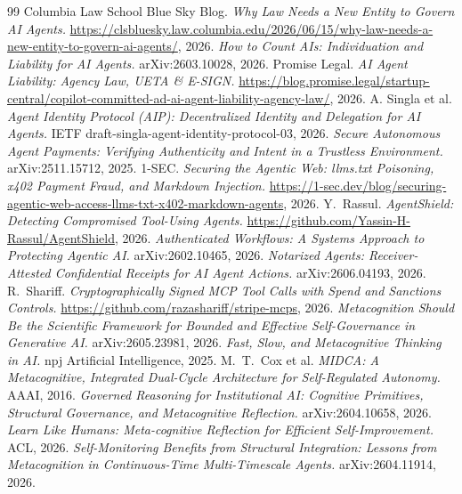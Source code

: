 \documentclass[11pt]{article}
\begin{document}
\begin{thebibliography}{99}
 Columbia Law School Blue Sky Blog. \emph{Why Law Needs a New Entity to Govern AI Agents.} \url{https://clsbluesky.law.columbia.edu/2026/06/15/why-law-needs-a-new-entity-to-govern-ai-agents/}, 2026.
 \emph{How to Count AIs: Individuation and Liability for AI Agents.} arXiv:2603.10028, 2026.
 Promise Legal. \emph{AI Agent Liability: Agency Law, UETA \& E-SIGN.} \url{https://blog.promise.legal/startup-central/copilot-committed-ad-ai-agent-liability-agency-law/}, 2026.
 A. Singla et al. \emph{Agent Identity Protocol (AIP): Decentralized Identity and Delegation for AI Agents.} IETF draft-singla-agent-identity-protocol-03, 2026.
 \emph{Secure Autonomous Agent Payments: Verifying Authenticity and Intent in a Trustless Environment.} arXiv:2511.15712, 2025.
 1-SEC. \emph{Securing the Agentic Web: llms.txt Poisoning, x402 Payment Fraud, and Markdown Injection.} \url{https://1-sec.dev/blog/securing-agentic-web-access-llms-txt-x402-markdown-agents}, 2026.
 Y.\ Rassul. \emph{AgentShield: Detecting Compromised Tool-Using Agents.} \url{https://github.com/Yassin-H-Rassul/AgentShield}, 2026.
 \emph{Authenticated Workflows: A Systems Approach to Protecting Agentic AI.} arXiv:2602.10465, 2026.
 \emph{Notarized Agents: Receiver-Attested Confidential Receipts for AI Agent Actions.} arXiv:2606.04193, 2026.
 R.\ Shariff. \emph{Cryptographically Signed MCP Tool Calls with Spend and Sanctions Controls.} \url{https://github.com/razashariff/stripe-mcps}, 2026.
 \emph{Metacognition Should Be the Scientific Framework for Bounded and Effective Self-Governance in Generative AI.} arXiv:2605.23981, 2026.
 \emph{Fast, Slow, and Metacognitive Thinking in AI.} npj Artificial Intelligence, 2025.
 M.\ T.\ Cox et al. \emph{MIDCA: A Metacognitive, Integrated Dual-Cycle Architecture for Self-Regulated Autonomy.} AAAI, 2016.
 \emph{Governed Reasoning for Institutional AI: Cognitive Primitives, Structural Governance, and Metacognitive Reflection.} arXiv:2604.10658, 2026.
 \emph{Learn Like Humans: Meta-cognitive Reflection for Efficient Self-Improvement.} ACL, 2026.
 \emph{Self-Monitoring Benefits from Structural Integration: Lessons from Metacognition in Continuous-Time Multi-Timescale Agents.} arXiv:2604.11914, 2026.

\end{thebibliography}
\end{document}

